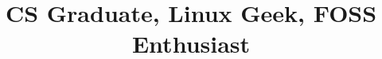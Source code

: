 \documentclass[10pt, a4paper]{moderncv}
\title{CS Graduate, Linux Geek, FOSS Enthusiast}
\begin{document}
\maketitle
\\
\\


\\
\\
\\
\\
\end{document}
